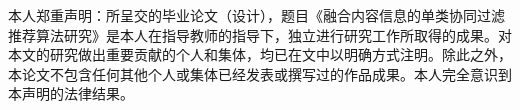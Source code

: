 \newpage
\centerline{\heiti{}}


\vskip 3cm 


\begin{spacing}{2.0}
本人郑重声明：所呈交的毕业论文（设计），题目《融合内容信息的单类协同过滤推荐算法研究》是本人在指导教师的指导下，独立进行研究工作所取得的成果。对本文的研究做出重要贡献的个人和集体，均已在文中以明确方式注明。除此之外，本论文不包含任何其他个人或集体已经发表或撰写过的作品成果。本人完全意识到本声明的法律结果。

\vskip 3cm

{}
\end{spacing}


